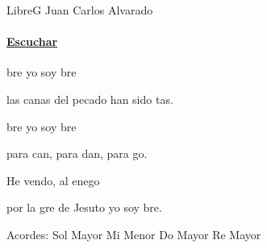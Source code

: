 \documentclass[12pt, spanish]{book}
\begin{document}
    \begin{song}{Libre}{G}
        {} %
        {Juan Carlos Alvarado}
        {} %
        {}
        \ifChordBk
        \paragraph{\mbox{}\hfill\protect\href{https://open.spotify.com/intl-es/track/2ingUl2WYQjhm4JQCmVBLs}{Escuchar}\mbox{}\hfill}
        \fi


        \begin{SBOpGroup}
            bre yo soy bre

            las canas del pecado han sido tas.

            bre yo soy bre

            para can, para dan, para go.
        \end{SBOpGroup}

        \begin{SBChorus}
            He vendo, al enego

            por la gre de Jesuto yo soy bre.
        \end{SBChorus}

        \ifChordBk
        \begin{SBOpGroup}
            Acordes:
            \upchord{\G}\qquad Sol Mayor \hfill
            \upchord{\Em}\qquad Mi Menor \hfill\null\break
            \upchord{\C}\qquad Do Mayor \hfill
            \upchord{\D}\qquad Re Mayor \hfill\null\break
        \end{SBOpGroup}
        \fi
    \end{song}
\end{document}
